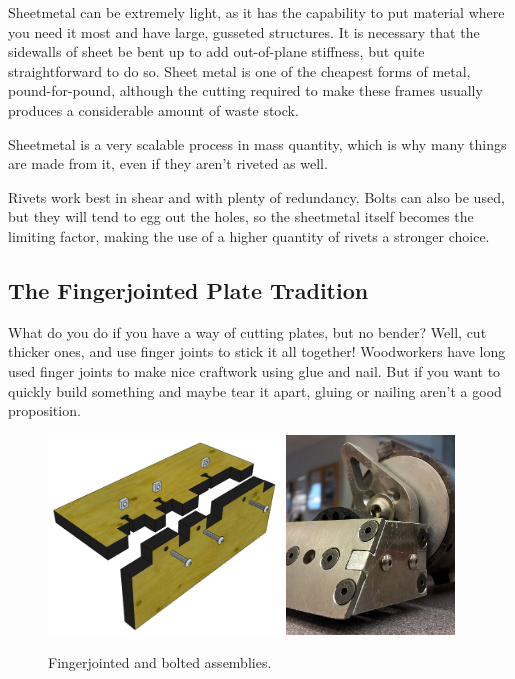 \documentclass[10pt,letterpaper]{book}
\begin{document}
	Sheetmetal can be extremely light, as it has the capability to put material where you need it most and have large, gusseted structures. It is necessary that the sidewalls of sheet be bent up to add out-of-plane stiffness, but quite straightforward to do so. Sheet metal is one of the cheapest forms of metal, pound-for-pound, although the cutting required to make these frames usually produces a considerable amount of waste stock. 
	
	Sheetmetal is a very scalable process in mass quantity, which is why many things are made from it, even if they aren't riveted as well.
	
	Rivets work best in shear and with plenty of redundancy. Bolts can also be used, but they will tend to egg out the holes, so the sheetmetal itself becomes the limiting factor, making the use of a higher quantity of rivets a stronger choice.
	
	\subsection{The Fingerjointed Plate Tradition}
	What do you do if you have a way of cutting plates, but no bender? Well, cut thicker ones, and use finger joints to stick it all together! Woodworkers have long used finger joints to make nice craftwork using glue and nail. But if you want to quickly build something and maybe tear it apart, gluing or nailing aren't a good proposition.
	
	\begin{figure}[H]
		\includegraphics[width=0.55\textwidth]{imgs/tradition_fingerjoint.png}
		\includegraphics[width=0.4\textwidth]{imgs/fingerjoint_battlebot.png}
		\caption{Fingerjointed and bolted assemblies.}
	\end{figure}
	
\end{document}
